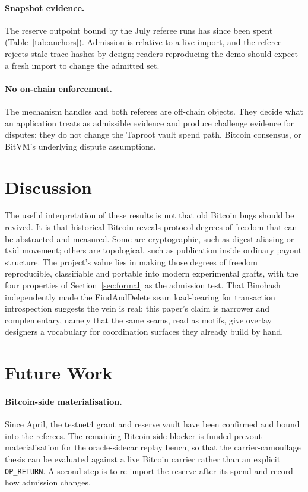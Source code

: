 \documentclass[11pt]{article}
\begin{document}
\paragraph{Snapshot evidence.} The reserve outpoint bound by the July referee
runs has since been spent (Table~\ref{tab:anchors}). Admission is relative to a
live import, and the referee rejects stale trace hashes by design; readers
reproducing the demo should expect a fresh import to change the admitted set.

\paragraph{No on-chain enforcement.} The mechanism handles and both referees are
off-chain objects. They decide what an application treats as admissible
evidence and produce challenge evidence for disputes; they do not change the
Taproot vault spend path, Bitcoin consensus, or BitVM's underlying dispute
assumptions.

\section{Discussion}

The useful interpretation of these results is not that old Bitcoin bugs should
be revived. It is that historical Bitcoin reveals protocol degrees of freedom
that can be abstracted and measured. Some are cryptographic, such as digest
aliasing or txid movement; others are topological, such as publication inside
ordinary payout structure. The project's value lies in making those degrees of
freedom reproducible, classifiable and portable into modern experimental
grafts, with the four properties of Section~\ref{sec:formal} as the admission
test. That Binohash independently made the FindAndDelete seam load-bearing for
transaction introspection suggests the vein is real; this paper's claim is
narrower and complementary, namely that the same seams, read as motifs, give
overlay designers a vocabulary for coordination surfaces they already build by
hand.

\section{Future Work}

\paragraph{Bitcoin-side materialisation.} Since April, the testnet4 grant and
reserve vault have been confirmed and bound into the referees. The remaining
Bitcoin-side blocker is funded-prevout materialisation for the oracle-sidecar
replay bench, so that the carrier-camouflage thesis can be evaluated against a
live Bitcoin carrier rather than an explicit \texttt{OP\_RETURN}. A second step
is to re-import the reserve after its spend and record how admission changes.
\end{document}
